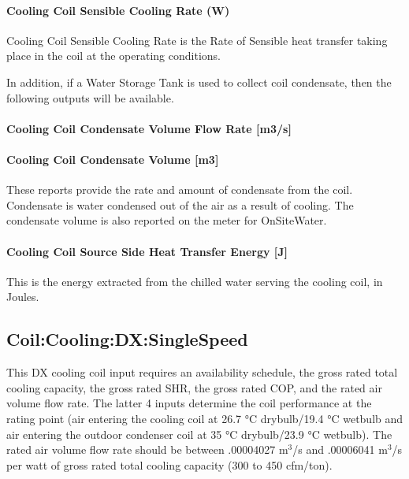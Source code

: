 \paragraph{Cooling Coil Sensible Cooling Rate (W)}\label{cooling-coil-sensible-cooling-rate-w-3}

Cooling Coil Sensible Cooling Rate is the Rate of Sensible heat transfer taking place in the coil at the operating conditions.

In addition, if a Water Storage Tank is used to collect coil condensate, then the following outputs will be available.

\paragraph{Cooling Coil Condensate Volume Flow Rate {[}m3/s{]}}\label{cooling-coil-condensate-volume-flow-rate-m3s-3}

\paragraph{Cooling Coil Condensate Volume {[}m3{]}}\label{cooling-coil-condensate-volume-m3-3}

These reports provide the rate and amount of condensate from the coil. Condensate is water condensed out of the air as a result of cooling. The condensate volume is also reported on the meter for OnSiteWater.

\paragraph{Cooling Coil Source Side Heat Transfer Energy {[}J{]}}\label{cooling-coil-source-side-heat-transfer-energy-j-1}

This is the energy extracted from the chilled water serving the cooling coil, in Joules.

\subsection{Coil:Cooling:DX:SingleSpeed}\label{coilcoolingdxsinglespeed}

This DX cooling coil input requires an availability schedule, the gross rated total cooling capacity, the gross rated SHR, the gross rated COP, and the rated air volume flow rate. The latter 4 inputs determine the coil performance at the rating point (air entering the cooling coil at 26.7 °C drybulb/19.4 °C wetbulb and air entering the outdoor condenser coil at 35 °C drybulb/23.9 °C wetbulb). The rated air volume flow rate should be between .00004027 m\(^{3}\)/s and .00006041 m\(^{3}\)/s per watt of gross rated total cooling capacity (300 to 450 cfm/ton).

